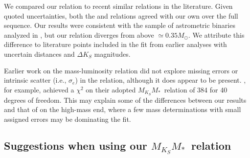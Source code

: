 \documentclass[twocolumn]{aastex62}
\newcommand{\mks}{$M_{K_S}$}
\newcommand{\mmk}{$M_{K_S}$\textendash$M_*$}
\begin{document}

We compared our relation to recent similar relations in the literature. Given quoted uncertainties, both the \citet{Delfosse2000} and \citet{Mann2015b} relations agreed with our own over the full sequence. Our results were consistent with the sample of astrometric binaries analyzed in \citet{Benedict2016}, but our relation diverges from \citet{Benedict2016} above $\simeq0.35M_\odot$. We attribute this difference to literature points included in the \citet{Benedict2016} fit from earlier analyses with uncertain distances and $\Delta K_S$ magnitudes. %

Earlier work on the mass-luminosity relation did not explore missing errors or intrinsic scatter (i.e., $\sigma_e$) in the relation, although it does appear to be present. \citet{Benedict2016}, for example, achieved a $\chi^2$ on their adopted \mmk\ relation of 384 for 40 degrees of freedom. This may explain some of the differences between our results and that of \citet{Benedict2016} on the high-mass end, where a few mass determinations with small assigned errors may be dominating the fit. 

\subsection{Suggestions when using our \mmk\ relation}\label{sec:caveats}
\end{document}
